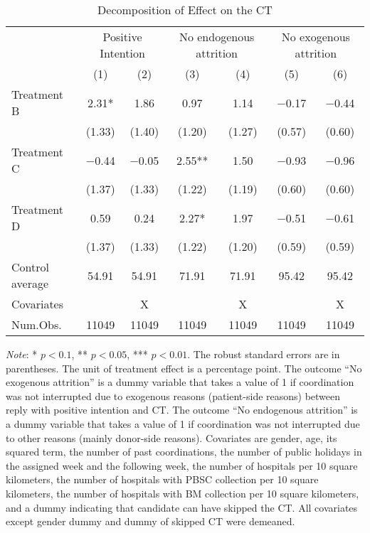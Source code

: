 \documentclass[12pt, a4paper]{article}
\begin{document}
\begin{table}[H]

\caption{\label{tab:lm-test-decompose}Decomposition of Effect on the CT}
\centering
\fontsize{8}{10}\selectfont
\begin{threeparttable}
\begin{tabular}[t]{>{\raggedright\arraybackslash}p{20em}cccccc}
\toprule
\multicolumn{1}{c}{ } & \multicolumn{2}{c}{Positive Intention} & \multicolumn{2}{c}{No endogenous attrition} & \multicolumn{2}{c}{No exogenous attrition} \\
\cmidrule(l{3pt}r{3pt}){2-3} \cmidrule(l{3pt}r{3pt}){4-5} \cmidrule(l{3pt}r{3pt}){6-7}
  & (1) & (2) & (3) & (4) & (5) & (6)\\
\midrule
Treatment B & \num{2.31}* & \num{1.86} & \num{0.97} & \num{1.14} & \num{-0.17} & \num{-0.44}\\
 & (\num{1.33}) & (\num{1.40}) & (\num{1.20}) & (\num{1.27}) & (\num{0.57}) & (\num{0.60})\\
Treatment C & \num{-0.44} & \num{-0.05} & \num{2.55}** & \num{1.50} & \num{-0.93} & \num{-0.96}\\
 & (\num{1.37}) & (\num{1.33}) & (\num{1.22}) & (\num{1.19}) & (\num{0.60}) & (\num{0.60})\\
Treatment D & \num{0.59} & \num{0.24} & \num{2.27}* & \num{1.97} & \num{-0.51} & \num{-0.61}\\
 & (\num{1.37}) & (\num{1.33}) & (\num{1.22}) & (\num{1.20}) & (\num{0.59}) & (\num{0.59})\\
\midrule
Control average & 54.91 & 54.91 & 71.91 & 71.91 & 95.42 & 95.42\\
Covariates &  & X &  & X &  & X\\
Num.Obs. & \num{11049} & \num{11049} & \num{11049} & \num{11049} & \num{11049} & \num{11049}\\
\bottomrule
\end{tabular}
\begin{tablenotes}
\item \emph{Note}: * $p < 0.1$, ** $p < 0.05$, *** $p < 0.01$. The robust standard errors are in parentheses. The unit of treatment effect is a percentage point. The outcome ``No exogenous attrition'' is a dummy variable that takes a value of 1 if coordination was not interrupted due to exogenous reasons (patient-side reasons) between reply with positive intention and CT. The outcome ``No endogenous attrition'' is a dummy variable that takes a value of 1 if coordination was not interrupted due to other reasons (mainly donor-side reasons). Covariates are gender, age, its squared term, the number of past coordinations, the number of public holidays in the assigned week and the following week, the number of hospitals per 10 square kilometers, the number of hospitals with PBSC collection per 10 square kilometers, the number of hospitals with BM collection per 10 square kilometers, and a dummy indicating that candidate can have skipped the CT. All covariates except gender dummy and dummy of skipped CT were demeaned.
\end{tablenotes}
\end{threeparttable}
\end{table}
\end{document}
